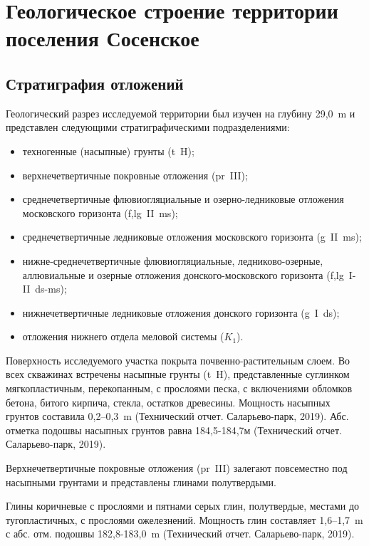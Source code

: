 \chapter{Геологическое строение территории поселения Сосенское}\label{ch:ch2}

\section{Стратиграфия отложений}\label{sec:ch2/sec1}

Геологический разрез исследуемой территории был изучен на глубину 
29,0~\si{\meter} и представлен следующими стратиграфическими подразделениями:

\begin{itemize}
    \item техногенные (насыпные) грунты (t~H);
    \item верхнечетвертичные покровные отложения (pr~III);
    \item среднечетвертичные флювиогляциальные и озерно-ледниковые отложения 
    московского горизонта (f,lg~II~ms);
    \item среднечетвертичные ледниковые отложения московского горизонта (g~II~ms);
    \item нижне-среднечетвертичные флювиогляциальные, ледниково-озерные, 
    аллювиальные и озерные отложения донского-московского горизонта (f,lg~I-II~ds-ms);
    \item нижнечетвертичные ледниковые отложения донского горизонта (g~I~ds);
    \item отложения нижнего отдела меловой системы ($K_1$).
\end{itemize}


Поверхность исследуемого участка покрыта почвенно-растительным слоем. 
Во всех скважинах встречены насыпные грунты (t~H), представленные суглинком мягкопластичным, 
перекопанным, с прослоями песка, с включениями обломков бетона, битого кирпича, стекла, остатков 
древесины. 
Мощность насыпных грунтов составила 0,2--0,3~\si{\meter} (Технический отчет. Саларьево-парк, 2019). 
Абс. отметка подошвы насыпных грунтов равна 184,5-184,7м (Технический отчет. Саларьево-парк, 2019).

Верхнечетвертичные покровные отложения (pr~III) залегают повсеместно под насыпными грунтами и 
представлены глинами полутвердыми.

Глины коричневые с прослоями и пятнами серых глин, полутвердые, местами до тугопластичных, 
с прослоями ожелезнений. 
Мощность глин составляет 1,6--1,7~\si{\meter} с абс. отм. подошвы 182,8-183,0~\si{\meter} 
(Технический отчет. Саларьево-парк, 2019).

